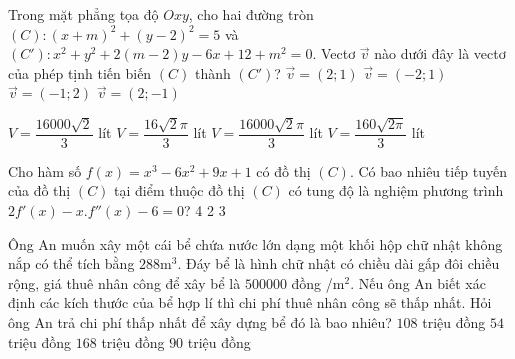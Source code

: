 \begin{ex}%
Trong mặt phẳng tọa độ $Oxy$, cho hai đường tròn $(C): (x+m)^2+(y-2)^2=5 $ và $(C'): x^2+y^2+2(m-2)y-6x+12+m^2=0 $. Vectơ $ \overrightarrow{v}$ nào dưới đây là vectơ của phép tịnh tiến biến $(C)$ thành $(C')$?
\choice
{\True $ \overrightarrow{v}=(2; 1)$}
{$ \overrightarrow{v}=(-2; 1)$}
{$ \overrightarrow{v}=(-1; 2)$}
{$ \overrightarrow{v}=(2; -1)$}
\end{ex}

\begin{ex}%
\choice
{$ V=\dfrac{16000\sqrt{2}}{3}$ lít}
{\True $ V=\dfrac{16\sqrt{2}\pi}{3}$ lít}
{$ V=\dfrac{16000\sqrt{2}\pi}{3}$ lít}
{$ V=\dfrac{160\sqrt{2\pi}}{3}$ lít}
\end{ex}

\begin{ex}%
Cho hàm số $ f(x)=x^3-6x^2+9x+1 $ có đồ thị $(C)$. Có bao nhiêu tiếp tuyến của đồ thị $(C)$ tại điểm thuộc đồ thị $(C)$ có tung độ là nghiệm phương trình $ 2f'(x)-x.f''(x)-6=0$?
\choice
{}
{4}
{2}
{3}
\end{ex}

\begin{ex}%
Ông An muốn xây một cái bể chứa nước lớn dạng một khối hộp chữ nhật không nắp có thể tích bằng $288$m$^3$. Đáy bể là hình chữ nhật có chiều dài gấp đôi chiều rộng, giá thuê nhân công để xây bể là $500000$ đồng /m$^2$. Nếu ông An biết xác định các kích thước của bể hợp lí thì chi phí thuê nhân công sẽ thấp nhất. Hỏi ông An trả chi phí thấp nhất để xây dựng bể đó là bao nhiêu? 
\choice
{\True $108$ triệu đồng}
{$54$ triệu đồng}
{$168$ triệu đồng}
{$90$ triệu đồng}

\end{ex}

